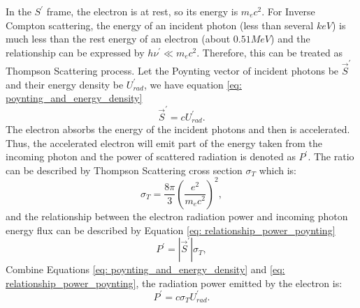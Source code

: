 \documentclass[a4paper, 12pt]{report}
\begin{document}
      In the $S^{\prime}$ frame, the electron is at rest, so its energy is $m_e c^2$. 
      For Inverse Compton scattering, the energy of an incident photon 
      (less than several $keV$) is much less than the rest energy of an electron 
      (about $0.51MeV$) and the relationship can be expressed by 
      $h\nu^{\prime} \ll m_e c^2$. Therefore, this can be treated as Thompson 
      Scattering process. Let the Poynting vector of incident photons be 
      $\vec{S}^{\prime}$ and their energy density be $U_{rad}^{\prime}$, we have 
      equation \ref{eq: poynting_and_energy_density}
      \begin{equation}
        \label{eq: poynting_and_energy_density}
        \vec{S}^{\prime} = c U_{rad}^{\prime} .
      \end{equation}
      The electron absorbs the energy of the incident photons and then is accelerated. 
      Thus, the accelerated electron will emit part of the energy taken from the incoming 
      photon and the power of scattered radiation is denoted as $P^{\prime}$.
      The ratio can be described by Thompson Scattering cross section $\sigma_{T}$ 
      which is:
      \begin{equation}
        \label{eq: thompson_cross_section}
        \sigma_{T} = \frac{8\pi}{3} \left(\frac{e^2}{m_e c^2}\right)^2 ,
      \end{equation}
      and the relationship between the electron radiation power and incoming photon 
      energy flux can be described by Equation \ref{eq: relationship_power_poynting}
      \begin{equation}
        \label{eq: relationship_power_poynting}
        P^{\prime} = \left| \vec{S}^{\prime} \right| \sigma_{T} ,
      \end{equation}
      Combine Equations \ref{eq: poynting_and_energy_density} and 
      \ref{eq: relationship_power_poynting}, the radiation power emitted by the 
      electron is: 
      \begin{equation}
        \label{eq: final_relationship}
        P^{\prime} = c \sigma_{T} U^{\prime}_{rad} .
      \end{equation}
\end{document}
